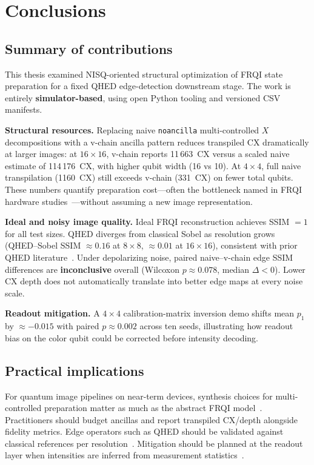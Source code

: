 \chapter{Conclusions}\label{ch:conclusions}
\thispagestyle{pagestyle}

\section{Summary of contributions}
This thesis examined NISQ-oriented structural optimization of FRQI state preparation for a fixed QHED edge-detection downstream stage. The work is entirely \textbf{simulator-based}, using open Python tooling and versioned CSV manifests.

\textbf{Structural resources.} Replacing naive \texttt{noancilla} multi-controlled $X$ decompositions with a v-chain ancilla pattern reduces transpiled CX dramatically at larger images: at $16\times 16$, v-chain reports 11\,663~CX versus a scaled naive estimate of 114\,176~CX, with higher qubit width (16 vs 10). At $4\times 4$, full naive transpilation (1160~CX) still exceeds v-chain (331~CX) on fewer total qubits. These numbers quantify preparation cost---often the bottleneck named in FRQI hardware studies~\cite{Geng2023ImprovedFRQI}---without assuming a new image representation.

\textbf{Ideal and noisy image quality.} Ideal FRQI reconstruction achieves SSIM $=1$ for all test sizes. QHED diverges from classical Sobel as resolution grows (QHED--Sobel SSIM $\approx 0.16$ at $8\times 8$, $\approx 0.01$ at $16\times 16$), consistent with prior QHED literature~\cite{Yao2017QHED}. Under depolarizing noise, paired naive--v-chain edge SSIM differences are \textbf{inconclusive} overall (Wilcoxon $p \approx 0.078$, median $\Delta < 0$). Lower CX depth does not automatically translate into better edge maps at every noise scale.

\textbf{Readout mitigation.} A $4\times 4$ calibration-matrix inversion demo shifts mean $p_1$ by $\approx -0.015$ with paired $p \approx 0.002$ across ten seeds, illustrating how readout bias on the color qubit could be corrected before intensity decoding.

\section{Practical implications}
For quantum image pipelines on near-term devices, synthesis choices for multi-controlled preparation matter as much as the abstract FRQI model~\cite{Le2011FRQI,Vale2023MCSU2,Azevedo2024LowDepthMCG}. Practitioners should budget ancillas and report transpiled CX/depth alongside fidelity metrics. Edge operators such as QHED should be validated against classical references per resolution~\cite{QiskitTextbookQuantumEdgeDetection}. Mitigation should be planned at the readout layer when intensities are inferred from measurement statistics~\cite{Mu2025GuidedImageFiltering}.


